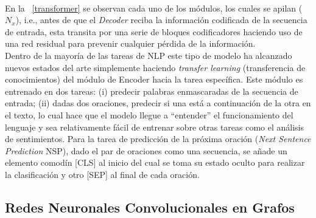 	\\
	En la \figurename~\ref{transformer} se observan cada uno de los módulos, los cuales se apilan ($N_x$), i.e., antes de que el \textit{Decoder} reciba la información codificada de la secuencia de entrada, esta transita por una serie de bloques codificadores haciendo uso de una red residual para prevenir cualquier pérdida de la información.
	\\
	Dentro de la mayoría de las tareas de NLP este tipo de modelo ha alcanzado nuevos estados del arte simplemente haciendo \textit{transfer learning} (transferencia de conocimientos) del módulo de Encoder hacia la tarea específica. Este módulo es entrenado en dos tareas: (i) predecir palabras enmascaradas de la secuencia de entrada; (ii) dadas dos oraciones, predecir si una está a continuación de la otra en el texto, lo cual hace que el modelo llegue a ``entender'' el funcionamiento del lenguaje y sea relativamente fácil de entrenar sobre otras tareas como el análisis de sentimientos. Para la tarea de predicción de la próxima oración (\textit{Next Sentence Prediction} NSP), dado el par de oraciones como una secuencia, se añade un elemento comodín [CLS] al inicio del cual se toma su estado oculto para realizar la clasificación y otro [SEP] al final de cada oración. 
	
\subsection{Redes Neuronales Convolucionales en Grafos}
	
